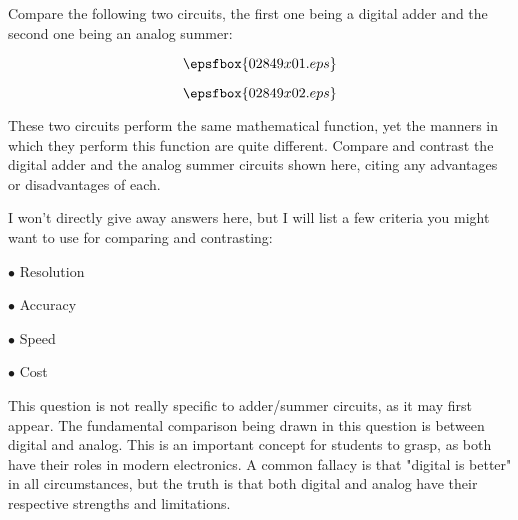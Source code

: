 

Compare the following two circuits, the first one being a digital adder and the second one being an analog summer:

$$\epsfbox{02849x01.eps}$$

$$\epsfbox{02849x02.eps}$$

These two circuits perform the same mathematical function, yet the manners in which they perform this function are quite different.  Compare and contrast the digital adder and the analog summer circuits shown here, citing any advantages or disadvantages of each.







I won't directly give away answers here, but I will list a few criteria you might want to use for comparing and contrasting:

\medskip
\item{$\bullet$} Resolution
\item{$\bullet$} Accuracy
\item{$\bullet$} Speed
\item{$\bullet$} Cost
\medskip







This question is not really specific to adder/summer circuits, as it may first appear.  The fundamental comparison being drawn in this question is between digital and analog.  This is an important concept for students to grasp, as both have their roles in modern electronics.  A common fallacy is that "digital is better" in all circumstances, but the truth is that both digital and analog have their respective strengths and limitations.




